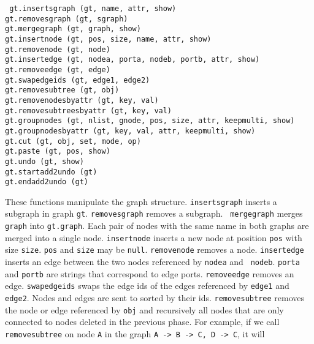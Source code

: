\begin{flushleft}\tt
gt.insertsgraph (gt, name, attr, show)\\
gt.removesgraph (gt, sgraph)\\
gt.mergegraph (gt, graph, show)\\
gt.insertnode (gt, pos, size, name, attr, show)\\
gt.removenode (gt, node)\\
gt.insertedge (gt, nodea, porta, nodeb, portb, attr, show)\\
gt.removeedge (gt, edge)\\
gt.swapedgeids (gt, edge1, edge2)\\
gt.removesubtree (gt, obj)\\
gt.removenodesbyattr (gt, key, val)\\
gt.removesubtreesbyattr (gt, key, val)\\
gt.groupnodes (gt, nlist, gnode, pos, size, attr, keepmulti, show)\\
gt.groupnodesbyattr (gt, key, val, attr, keepmulti, show)\\
gt.cut (gt, obj, set, mode, op)\\
gt.paste (gt, pos, show)\\
gt.undo (gt, show)\\
gt.startadd2undo (gt)\\
gt.endadd2undo (gt)\\
\end{flushleft}\vspace{-2\itemsep}
These functions manipulate the graph structure. {\tt insertsgraph} inserts a
subgraph in graph {\tt gt}. {\tt removesgraph} removes a subgraph.  {\tt
mergegraph} merges {\tt graph} into {\tt gt.graph}. Each pair of nodes with the
same name in both graphs are merged into a single node. {\tt insertnode}
inserts a new node at position {\tt pos} with size {\tt size}. {\tt pos} and
{\tt size} may be {\tt null}. {\tt removenode} removes a node. {\tt insertedge}
inserts an edge between the two nodes referenced by {\tt nodea} and {\tt
nodeb}.  {\tt porta} and {\tt portb} are strings that correspond to {\DOT} edge
ports.  {\tt removeedge} removes an edge. {\tt swapedgeids} swaps the edge ids
of the edges referenced by {\tt edge1} and {\tt edge2}. Nodes and edges are
sent to {\DOT} sorted by their ids. {\tt removesubtree} removes the node or
edge referenced by {\tt obj} and recursively all nodes that are only connected
to nodes deleted in the previous phase. For example, if we call {\tt
removesubtree} on node {\tt A} in the graph {\tt A -> B -> C, D -> C}, it will
